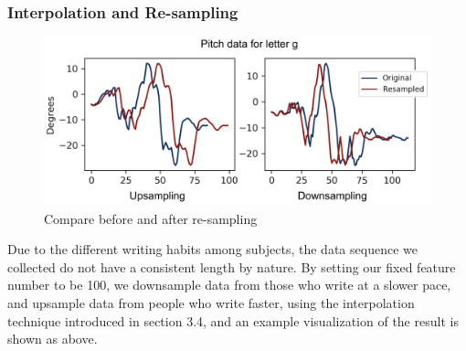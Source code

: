 \documentclass{article}
\begin{document}
\begin{multicols*}{2}
\subsubsection{Interpolation and Re-sampling}
\begin{figure}[H]
    \centering
    \includegraphics[scale = 0.21]{resample.png}
    \caption{Compare before and after re-sampling}
\end{figure}
Due to the different writing habits among subjects, the data sequence we collected do not have a consistent length by nature. By setting our fixed feature number to be 100, we downsample data from those who write at a slower pace, and upsample data from people who write faster, using the interpolation technique introduced in section 3.4, and an example visualization of the result is shown as above.


\end{multicols*}
\end{document}
